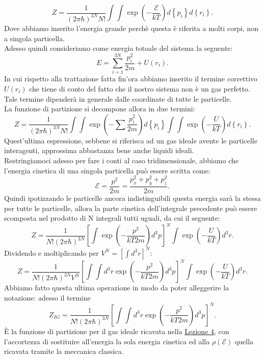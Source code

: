 \[
	Z = \frac{1}{\left( 2\pi \hbar  \right) ^{3N}N!} \int \int \exp\left( -\frac{\mathcal{E}}{kT} \right) d\left\{ p_{i} \right\} d\left\{ r_{i} \right\} 
.\] 
Dove abbiamo inserito l'energia grande perchè questa è riferita a molti corpi, non a singola particella.\\
Adesso quindi consideriamo come energia totoale del sistema la seguente:
\[
	E=\sum_{i =1}^{3N} \frac{p_{i}^2}{2m} + U\left(  r_{i}  \right) 
.\] 
In cui rispetto alla trattazione fatta fin'ora abbiamo inserito il termine correttivo $U\left( r_{i} \right) $ che tiene di conto del fatto che il nostro sistema non è un gas perfetto. Tale termine dipenderà in generale dalle coordinate di tutte le particelle. \\
La funzione di partizione si decompone allora in due termini:
\[
	Z = \frac{1}{\left( 2\pi \hbar  \right) ^{3N}N!} \int \int \exp\left( - \sum_{}^{} \frac{p_{i}^2}{2m} \right) d\left\{ p_{i} \right\} 
	\int\int \exp\left( -\frac{U}{kT} \right) d\left\{ r_{i} \right\} 
.\] 
Quest'ultima espressione, sebbene si riferisca ad un gas ideale avente le particelle interagenti, approssima abbastanza bene anche liquidi ideali.\\
Restringiamoci adesso per fare i conti al caso tridimensionale, abbiamo che l'energia cinetica di una singola particella può essere scritta come:
\[
	\mathcal{E} = \frac{p^2}{2m} = \frac{p_{x}^2+p_{y}^2+ p_{z}^2}{2m}
.\] 
Quindi ipotizzando le particelle ancora indistinguibili questa energia sarà la stessa per tutte le particelle, allora la parte cinetica dell'integrale precedente può essere scomposta nel prodotto di N integrali tutti uguali, da cui il seguente:
\[
	Z = \frac{1}{N! \left( 2\pi\hbar \right)^{3N} }
	\left[ \int\exp\left( -\frac{p^2}{kT2m} \right) d^3p \right] ^{N} 
	\int\exp\left( -\frac{U}{kT} \right) d^3r 
.\] 
Dividendo e moltiplicando per $V^{N} =  \left[\int d^3r \right]^{N}$:
\[
	Z = \frac{1}{N! \left( 2\pi\hbar \right)^{3N} V^{N}}
	\left[\int \int d^3r \exp\left( -\frac{p^2}{kT2m} \right) d^3p \right] ^{N} 
	\int\exp\left( -\frac{U}{kT} \right) d^3 r 
.\] 
Abbiamo fatto questa ultima operazione in modo da poter alleggerire la notazione: adesso il termine
\[
	Z_{IG} = \frac{1}{N! \left( 2\pi\hbar \right)^{3N}}
	\left[\int \int d^3r \exp\left( -\frac{p^2}{kT2m} \right) d^3p \right] ^{N}
.\] 
È la funzione di partizione per il gas ideale ricavata nella \hyperref[eq:DefZ]{Lezione 4}, con l'accortezza di sostituire all'energia la sola energia cinetica ed alla $\rho\left( \mathcal{E} \right)$ quella ricavata tramite la meccanica classica.\\
